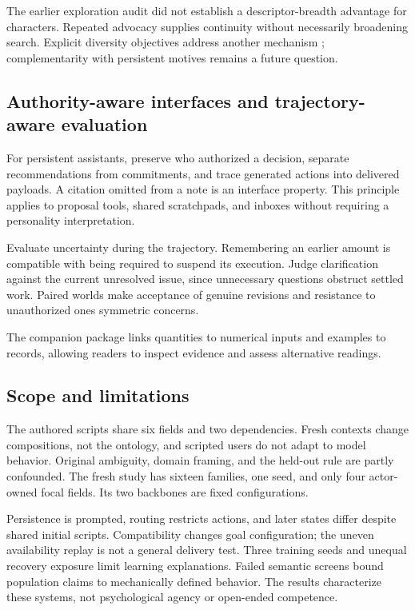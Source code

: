 \documentclass{svproc}
\begin{document}
The earlier exploration audit did not establish a descriptor-breadth advantage for characters. Repeated advocacy supplies continuity without necessarily broadening search. Explicit diversity objectives address another mechanism \cite{rainbow,curiosity}; complementarity with persistent motives remains a future question.

\subsection{Authority-aware interfaces and trajectory-aware evaluation}
For persistent assistants, preserve who authorized a decision, separate recommendations from commitments, and trace generated actions into delivered payloads. A citation omitted from a note is an interface property. This principle applies to proposal tools, shared scratchpads, and inboxes without requiring a personality interpretation.

Evaluate uncertainty during the trajectory. Remembering an earlier amount is compatible with being required to suspend its execution. Judge clarification against the current unresolved issue, since unnecessary questions obstruct settled work. Paired worlds make acceptance of genuine revisions and resistance to unauthorized ones symmetric concerns.

The companion package links quantities to numerical inputs and examples to records, allowing readers to inspect evidence and assess alternative readings.

\subsection{Scope and limitations}
The authored scripts share six fields and two dependencies. Fresh contexts change compositions, not the ontology, and scripted users do not adapt to model behavior. Original ambiguity, domain framing, and the held-out rule are partly confounded. The fresh study has sixteen families, one seed, and only four actor-owned focal fields. Its two backbones are fixed configurations.

Persistence is prompted, routing restricts actions, and later states differ despite shared initial scripts. Compatibility changes goal configuration; the uneven availability replay is not a general delivery test. Three training seeds and unequal recovery exposure limit learning explanations. Failed semantic screens bound population claims to mechanically defined behavior. The results characterize these systems, not psychological agency or open-ended competence.
\end{document}

